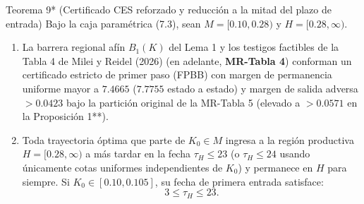 \documentclass[11pt,letterpaper]{article}
\theoremstyle{plain}
\newtheorem*{namedthm}{\protect\namedthmname}
\newcommand{\namedthmname}{}
\newenvironment{thm_box}[1]{\renewcommand{\namedthmname}{#1}\begin{namedthm}}{\end{namedthm}}
\begin{document}
\begin{thm_box}{Teorema 9* (Certificado CES reforzado y reducción a la mitad del plazo de entrada)}
Bajo la caja paramétrica (7.3), sean $M=[0.10,0.28)$ y $H=[0.28,\infty)$.
\begin{enumerate}
\item La barrera regional afín $B_1(K)$ del Lema 1 y los testigos factibles de la Tabla 4 de Milei y Reidel (2026) (en adelante, \textbf{MR-Tabla 4}) conforman un certificado estricto de primer paso (FPBB) con margen de permanencia uniforme mayor a $7.4665$ ($7.7755$ estado a estado) y margen de salida adversa $>0.0423$ bajo la partición original de la MR-Tabla 5 (elevado a $>0.0571$ en la Proposición 1**).
\item Toda trayectoria óptima que parte de $K_0\in M$ ingresa a la región productiva $H=[0.28,\infty)$ a más tardar en la fecha \textbf{$\tau_H \le 23$} (o $\tau_H \le 24$ usando únicamente cotas uniformes independientes de $K_0$) y permanece en $H$ para siempre. Si $K_0\in[0.10,0.105]$, su fecha de primera entrada satisface:
\[
3 \le \tau_H \le 23.
\]
\end{enumerate}
\end{thm_box}
\end{document}
